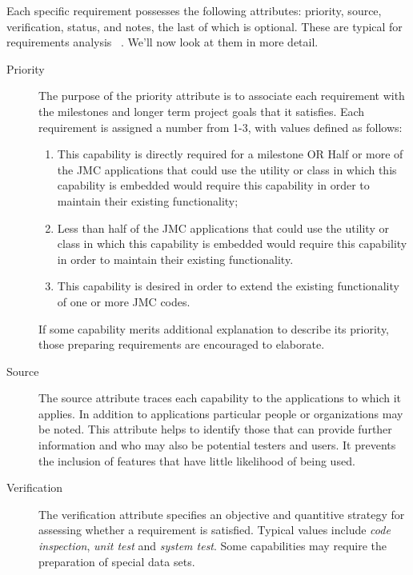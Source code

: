 
Each specific requirement possesses the following attributes:  priority, 
source, verification, status, and notes, the last of which is optional.  
These are typical for requirements
analysis ~\cite{wiegers}.  We'll now look at them in more detail.

\begin{description}
\item [Priority] The purpose of the priority attribute is to associate
each requirement with the milestones and longer term project goals that 
it satisfies.  Each requirement is assigned a number from 1-3, with
values defined as follows:
\begin{enumerate}

\item This capability is directly required for a milestone OR
Half or more of the JMC applications that could use the utility or class
in which this capability is embedded would require this
capability in order to maintain their existing functionality;
 
\item Less than half of the JMC applications that could use
the utility or class in which this capability is embedded 
would require this capability in order to maintain their existing
functionality.

\item This capability is desired in order to extend
the existing functionality of one or more JMC codes.

\end{enumerate}

If some capability merits additional explanation to describe 
its priority, those preparing requirements are encouraged 
to elaborate.
 
\item [Source] The source attribute traces each capability
to the applications to which it applies.  In addition to applications
particular people or organizations may be noted.   This attribute 
helps to identify those that can provide further 
information and who may also be potential testers and users.  It
prevents the inclusion of features that have little likelihood of
being used.

\item [Verification] The verification attribute specifies an objective
and quantitive strategy for assessing whether a requirement is
satisfied.  Typical values include {\it code inspection}, 
{\it unit test} and {\it system test}.
Some capabilities may require the preparation of special data sets.


\end{description}
